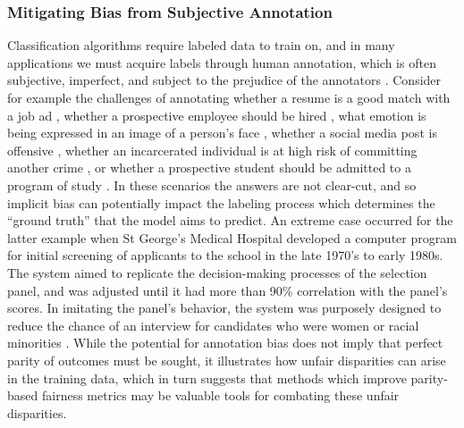 \documentclass[11pt,dvipdfm]{article}
\begin{document}
\subsubsection{Mitigating Bias from Subjective Annotation}
Classification algorithms require labeled data to train on, and in many applications we must acquire labels through human annotation, which is often subjective, imperfect, and subject to the prejudice of the annotators \cite{barocas2016big}.  Consider for example the challenges of annotating whether a resume is a good match with a job ad \cite{ketki}, whether a prospective employee should be hired \cite{dastin2018amazon}, what emotion is being expressed in an image of a person's face \cite{barrett2019emotional}, whether a social media post is offensive \cite{HateSpeechDetectionBias}, whether an incarcerated individual is at high risk of committing another crime \cite{angwin2016machine}, or whether a prospective student should be admitted to a program of study \cite{lowry1988blot}.  In these scenarios the answers are not clear-cut, and so implicit bias can potentially impact the labeling process which determines the ``ground truth'' that the model aims to predict.  An extreme case occurred for the latter example when St George's Medical Hospital developed a computer program for initial screening of applicants to the school in the late 1970's to early 1980s.  The system aimed to replicate the decision-making processes of the selection panel, and was adjusted until it had more than 90\% correlation with the panel's scores.  In imitating the panel's behavior, the system was purposely designed to reduce the chance of an interview for candidates who were women or racial minorities 
\cite{lowry1988blot}.  While the potential for annotation bias does not imply that perfect parity of outcomes must be sought, it illustrates how unfair disparities can arise in the training data, which in turn suggests that methods which improve parity-based fairness metrics may be valuable tools for combating these unfair disparities.

\end{document}
